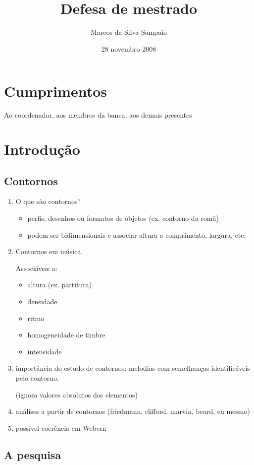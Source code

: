 \documentclass[12pt,a4paper]{article}
\title{Defesa de mestrado}
\author{Marcos da Silva Sampaio}
\date{28 novembro 2008}
\begin{document}
\maketitle
\thispagestyle{empty}

\section*{Cumprimentos}

Ao coordenador, aos membros da banca, aos demais presentes

\section{Introdução}

\subsection{Contornos}

\begin{enumerate}
\item O que são contornos?
  \begin{itemize}
  \item perfis, desenhos ou formatos de objetos (ex. contorno da romã)
  \item podem ser bidimensionais e associar altura a comprimento,
    largura, etc.
  \end{itemize}
\item Contornos em música.

  Associáveis a:
  \begin{itemize}
  \item altura (ex. partitura)
  \item densidade
  \item ritmo
  \item homogeneidade de timbre
  \item intensidade
  \end{itemize}
\item importância do estudo de contornos: melodias com semelhanças
  identificáveis pelo contorno.

  (ignora valores absolutos dos elementos)
\item análises a partir de contornos (friedmann, clifford, marvin, beard, eu mesmo)
\item possível coerência em Webern
\end{enumerate}

\subsection{A pesquisa}
\end{document}
